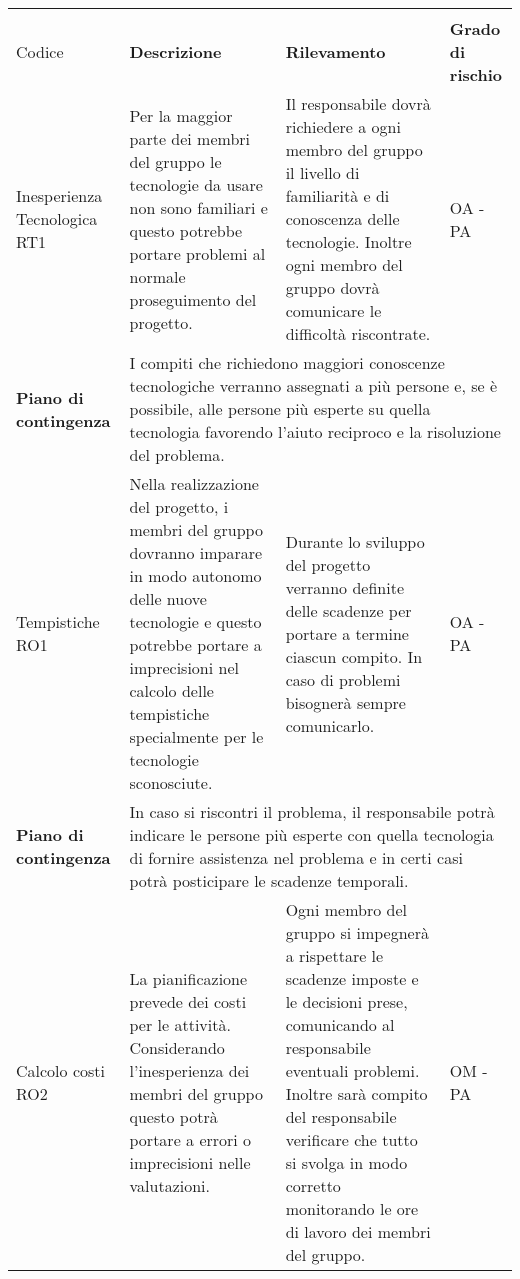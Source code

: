 \begin{center}
		\begin{longtable}{|p{}|p{}|p{}|p{}|}
			\hline
			\rowcolor{lighter-grayer}
			\centering\textbf{Nome \\ Codice} & \centering\textbf{Descrizione} & \centering\textbf{Rilevamento} & \textbf{Grado di rischio} \\
			\hline
			\endfirsthead
		
		\hline
		\centering Inesperienza Tecnologica RT1& Per la maggior parte dei membri del gruppo le tecnologie da usare non sono familiari e questo potrebbe portare problemi al normale proseguimento del progetto.  & Il responsabile dovrà richiedere a ogni membro del gruppo il livello di familiarità e di conoscenza delle tecnologie. Inoltre ogni membro del gruppo dovrà comunicare le difficoltà riscontrate. &  OA - PA \\
		\hline
		\centering \textbf{Piano di contingenza} & \multicolumn{3}{p{0.84\textwidth}}{I compiti che richiedono maggiori conoscenze tecnologiche verranno assegnati a più persone e, se è possibile, alle persone più esperte su quella tecnologia favorendo l'aiuto reciproco e la risoluzione del problema.} \\
		\hline
		\centering Tempistiche RO1& Nella realizzazione del progetto, i membri del gruppo dovranno imparare in modo autonomo delle nuove tecnologie e questo potrebbe portare a imprecisioni nel calcolo delle tempistiche specialmente per le tecnologie sconosciute. & Durante lo sviluppo del progetto verranno definite delle scadenze per portare a termine ciascun compito. In caso di problemi bisognerà sempre comunicarlo. & OA - PA \\
		\hline
		\centering \textbf{Piano di contingenza} & \multicolumn{3}{p{0.84\textwidth}}{In caso si riscontri il problema, il responsabile potrà indicare le persone più esperte con quella tecnologia di fornire assistenza nel problema e in certi casi potrà posticipare le scadenze temporali.} \\
		\hline
		\centering Calcolo costi RO2& La pianificazione prevede dei costi per le attività. Considerando l'inesperienza dei membri del gruppo questo potrà portare a errori o imprecisioni nelle valutazioni. & Ogni membro del gruppo si impegnerà a rispettare le scadenze imposte e le decisioni prese, comunicando al responsabile eventuali problemi. Inoltre sarà compito del responsabile verificare che tutto si svolga in modo corretto monitorando le ore di lavoro dei membri del gruppo. & OM - PA\\

\end{longtable}
\end{center}
